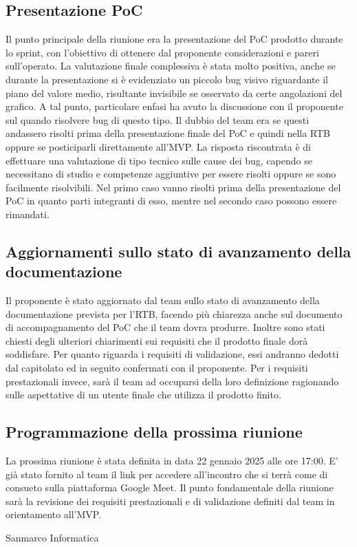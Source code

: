 \subsection{Presentazione PoC}
Il punto principale della riunione era la presentazione del PoC prodotto durante lo sprint, con l'obiettivo di ottenere dal proponente considerazioni e pareri sull'operato.
La valutazione finale complessiva è stata molto positiva, anche se durante la presentazione si è evidenziato un piccolo bug visivo riguardante il piano del valore medio, risultante invisibile se
osservato da certe angolazioni del grafico.
A tal punto, particolare enfasi ha avuto la discussione con il proponente sul quando risolvere bug di questo tipo. Il dubbio del team era se questi andassero risolti prima della presentazione finale del PoC e quindi nella RTB oppure
se posticiparli direttamente all'MVP. La risposta riscontrata è di effettuare una valutazione di tipo tecnico sulle cause dei bug, capendo se necessitano di studio e competenze aggiuntive per essere risolti oppure se sono facilmente risolvibili.
Nel primo caso vanno risolti prima della presentazione del PoC in quanto parti integranti di esso, mentre nel secondo caso possono essere rimandati.
\subsection{Aggiornamenti sullo stato di avanzamento della documentazione}
Il proponente è stato aggiornato dal team sullo stato di avanzamento della documentazione prevista per l'RTB, facendo più chiarezza anche sul documento di accompagnamento del PoC che il team dovra produrre.
Inoltre sono stati chiesti degli ulteriori chiarimenti sui requisiti che il prodotto finale dorà soddisfare.
Per quanto riguarda i requisiti di validazione, essi andranno dedotti dal capitolato ed in seguito confermati con il proponente.
Per i requisiti prestazionali invece, sarà il team ad occuparsi della loro definizione ragionando sulle aspettative di un utente finale che utilizza il prodotto finito.
\subsection{Programmazione della prossima riunione}
La prossima riunione è stata definita in data 22 gennaio 2025 alle ore 17:00. E' già stato fornito al team il link per accedere all'incontro che si terrà come di consueto
sulla piattaforma Google Meet. Il punto fondamentale della riunione sarà la revisione dei requisiti prestazionali e di validazione definiti dal team in orientamento all'MVP.


\hfill\signature{Approvazione esterna}{Sanmarco Informatica}
